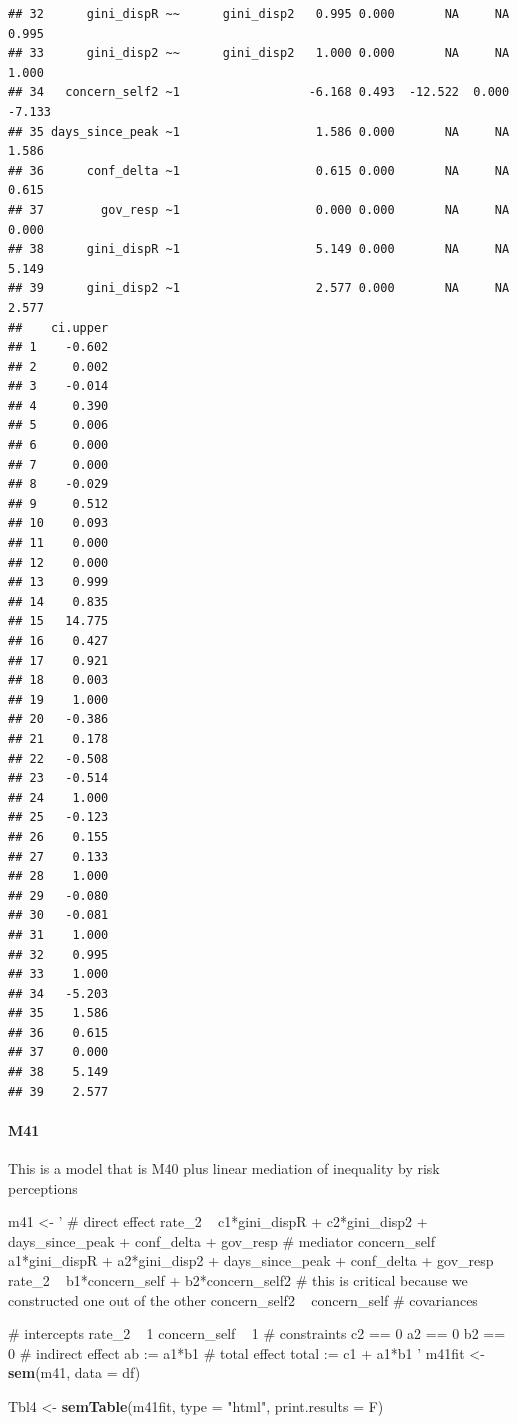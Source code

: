 \documentclass[
]{article}
\newenvironment{Shaded}{\begin{snugshade}}{\end{snugshade}}
\newcommand{\DataTypeTok}[1]{\textcolor[rgb]{0.13,0.29,0.53}{#1}}
\newcommand{\KeywordTok}[1]{\textcolor[rgb]{0.13,0.29,0.53}{\textbf{#1}}}
\newcommand{\NormalTok}[1]{#1}
\newcommand{\StringTok}[1]{\textcolor[rgb]{0.31,0.60,0.02}{#1}}
\begin{document}
\begin{verbatim}
## 32      gini_dispR ~~      gini_disp2   0.995 0.000       NA     NA    0.995
## 33      gini_disp2 ~~      gini_disp2   1.000 0.000       NA     NA    1.000
## 34   concern_self2 ~1                  -6.168 0.493  -12.522  0.000   -7.133
## 35 days_since_peak ~1                   1.586 0.000       NA     NA    1.586
## 36      conf_delta ~1                   0.615 0.000       NA     NA    0.615
## 37        gov_resp ~1                   0.000 0.000       NA     NA    0.000
## 38      gini_dispR ~1                   5.149 0.000       NA     NA    5.149
## 39      gini_disp2 ~1                   2.577 0.000       NA     NA    2.577
##    ci.upper
## 1    -0.602
## 2     0.002
## 3    -0.014
## 4     0.390
## 5     0.006
## 6     0.000
## 7     0.000
## 8    -0.029
## 9     0.512
## 10    0.093
## 11    0.000
## 12    0.000
## 13    0.999
## 14    0.835
## 15   14.775
## 16    0.427
## 17    0.921
## 18    0.003
## 19    1.000
## 20   -0.386
## 21    0.178
## 22   -0.508
## 23   -0.514
## 24    1.000
## 25   -0.123
## 26    0.155
## 27    0.133
## 28    1.000
## 29   -0.080
## 30   -0.081
## 31    1.000
## 32    0.995
## 33    1.000
## 34   -5.203
## 35    1.586
## 36    0.615
## 37    0.000
## 38    5.149
## 39    2.577
\end{verbatim}

\hypertarget{m41}{%
\paragraph{M41}\label{m41}}

This is a model that is M40 plus linear mediation of inequality by risk
perceptions

\begin{Shaded}
\begin{Highlighting}[]
\NormalTok{m41 <-}\StringTok{ '   # direct effect}
\StringTok{             rate_2 ~ c1*gini_dispR + c2*gini_disp2 + days_since_peak + conf_delta + gov_resp }
\StringTok{           # mediator}
\StringTok{             concern_self ~ a1*gini_dispR + a2*gini_disp2 + days_since_peak + conf_delta + gov_resp }
\StringTok{             rate_2 ~ b1*concern_self + b2*concern_self2}
\StringTok{           # this is critical because we constructed one out of the other   }
\StringTok{             concern_self2 ~ concern_self}
\StringTok{           # covariances}

\StringTok{           # intercepts}
\StringTok{             rate_2 ~ 1}
\StringTok{             concern_self ~ 1}
\StringTok{           # constraints}
\StringTok{             c2 == 0}
\StringTok{             a2 == 0}
\StringTok{             b2 == 0}
\StringTok{           # indirect effect }
\StringTok{             ab := a1*b1}
\StringTok{           # total effect}
\StringTok{             total := c1 + a1*b1}
\StringTok{         '}
\NormalTok{m41fit <-}\StringTok{ }\KeywordTok{sem}\NormalTok{(m41, }\DataTypeTok{data =}\NormalTok{ df)}

\NormalTok{Tbl4 <-}\StringTok{ }\KeywordTok{semTable}\NormalTok{(m41fit, }\DataTypeTok{type =} \StringTok{"html"}\NormalTok{, }\DataTypeTok{print.results =}\NormalTok{ F)}
\end{Highlighting}
\end{Shaded}
\end{document}
